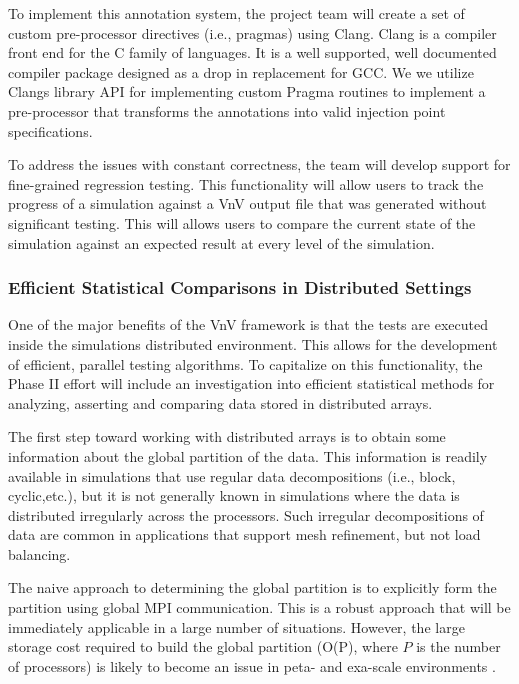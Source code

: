 To implement this annotation system, the project team will create a set of custom pre-processor directives (i.e., pragmas) using Clang. Clang is a compiler front end for the C family of languages. It is a well supported, well documented compiler package designed as a drop in replacement for GCC. We we utilize Clangs library API for implementing custom Pragma routines to implement a pre-processor that transforms the annotations into valid injection point specifications. 

To address the issues with constant correctness, the team will develop support for fine-grained regression testing. This functionality will allow users to track the progress of a simulation against a VnV output file that was generated without significant testing. This will allows users to compare the current state of the simulation against an expected result at every level of the simulation. 

\subsubsection{Efficient Statistical Comparisons in Distributed Settings} 

One of the major benefits of the VnV framework is that the tests are executed inside the simulations distributed environment. This allows for the development of efficient, parallel testing algorithms. To capitalize on this functionality, the Phase II effort will include an investigation into efficient statistical methods for analyzing, asserting and comparing data stored in distributed arrays. 

The first step toward working with distributed arrays is to obtain some information about the global partition of the data. This information is readily available in simulations that use regular data decompositions (i.e., block, cyclic,etc.), but it is not generally known in simulations where the data is distributed irregularly across the processors. Such irregular decompositions of data are common in applications that support mesh refinement, but not load balancing. 

The naive approach to determining the global partition is to explicitly form the partition using global MPI communication. This is a robust approach that will be immediately applicable in a large number of situations. However, the large storage cost required to build the global partition (O(P), where $P$ is the number of processors) is likely to become an issue in peta- and exa-scale environments \cite{hypre-assumed}. 

